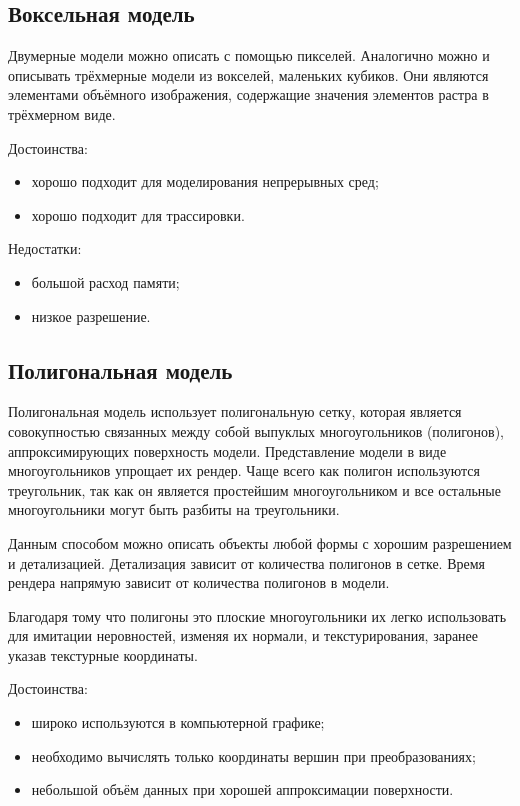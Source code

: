 \documentclass[12pt,a4paper,oneside]{report}
\begin{document}
    		\subsection{Воксельная модель}
    		\quad Двумерные модели можно описать с помощью пикселей. Аналогично можно и описывать трёхмерные модели из вокселей, маленьких кубиков. Они являются элементами объёмного изображения, содержащие значения элементов растра в трёхмерном виде.
    		
    		Достоинства:
    		\begin{itemize}
    			\item хорошо подходит для моделирования непрерывных сред;
    			\item хорошо подходит для трассировки.
    		\end{itemize}
    		
    		Недостатки:
    		\begin{itemize}
    			\item большой расход памяти;
    			\item низкое разрешение.
    		\end{itemize}
    		\subsection{Полигональная модель}
    		\quad Полигональная модель использует полигональную сетку, которая является совокупностью связанных между собой выпуклых многоугольников (полигонов), аппроксимирующих поверхность модели. Представление модели в виде многоугольников упрощает их рендер. Чаще всего как полигон используются треугольник, так как он является простейшим многоугольником и все остальные многоугольники могут быть разбиты на треугольники.
    		
			Данным способом можно описать объекты любой формы с хорошим разрешением и детализацией. Детализация зависит от количества полигонов в сетке. Время рендера напрямую зависит от количества полигонов в модели.
	
			Благодаря тому что полигоны это плоские многоугольники их легко использовать для имитации неровностей, изменяя их нормали, и текстурирования, заранее указав текстурные координаты.
    		
    		Достоинства:
    		\begin{itemize}
    			\item широко используются в компьютерной графике;
    			\item необходимо вычислять только координаты вершин при преобразованиях;
    			\item небольшой объём данных при хорошей аппроксимации поверхности.
    		\end{itemize}
    		
\end{document}
